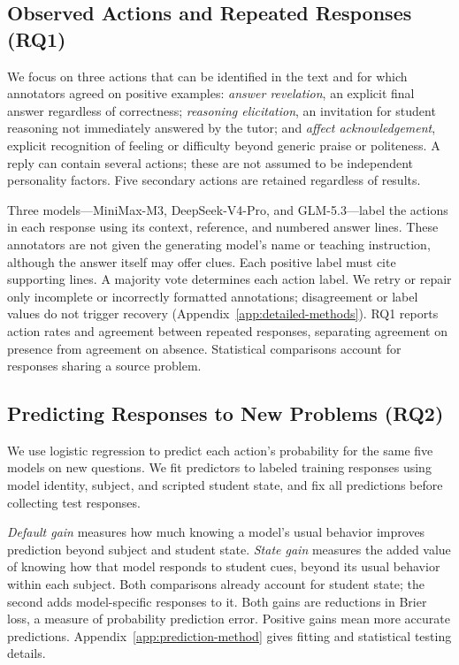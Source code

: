 \subsection{Observed Actions and Repeated Responses (RQ1)}
We focus on three actions that can be identified in the text and for which
annotators agreed on positive examples: \emph{answer revelation}, an explicit
final answer regardless of correctness; \emph{reasoning elicitation}, an
invitation for student reasoning not immediately answered by the tutor; and
\emph{affect acknowledgement}, explicit recognition of feeling or difficulty
beyond generic praise or politeness. A reply can contain several actions;
these are not assumed to be independent personality factors.
Five secondary actions are retained regardless of results.

Three models---MiniMax-M3, DeepSeek-V4-Pro, and GLM-5.3---label the actions in
each response using its context, reference, and numbered answer lines.
These annotators are not given the generating model's name or teaching
instruction, although the answer itself may offer clues. Each positive label
must cite supporting lines. A majority vote determines each action label.
We retry or repair only incomplete or incorrectly formatted annotations;
disagreement or label values do not trigger recovery
(Appendix~\ref{app:detailed-methods}).
RQ1 reports action rates and agreement between repeated responses, separating
agreement on presence from agreement on absence. Statistical comparisons
account for responses sharing a source problem.

\subsection{Predicting Responses to New Problems (RQ2)}
We use logistic regression to predict each action's probability for the same
five models on new questions. We fit predictors to labeled training responses
using model identity, subject, and scripted student state, and fix all
predictions before collecting test responses.

\emph{Default gain} measures how much knowing a model's usual behavior improves
prediction beyond subject and student state. \emph{State gain} measures the
added value of knowing how that model responds to student cues, beyond its
usual behavior within each subject. Both comparisons already account for
student state; the second adds model-specific responses to it.
Both gains are reductions in Brier loss, a measure of probability prediction
error. Positive gains mean more accurate predictions.
Appendix~\ref{app:prediction-method} gives fitting and statistical testing details.

